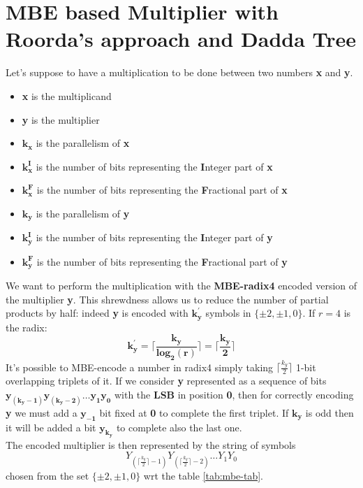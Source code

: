 \documentclass[a4paper]{article}
\begin{document}
\section{MBE based Multiplier with Roorda's approach and Dadda Tree}
	Let's suppose to have a multiplication to be done between two numbers \textbf{x} and \textbf{y}.
	\begin{itemize}
		\item \textbf{x} is the multiplicand
		\item \textbf{y} is the multiplier
		\item $\bm{k_x}$ is the parallelism of \textbf{x}
		\item $\bm{k_x^{I}}$ is the number of bits representing the \textbf{I}nteger part of \textbf{x}
		\item $\bm{k_x^{F}}$ is the number of bits representing the \textbf{F}ractional part of \textbf{x}
		\item $\bm{k_y}$ is the parallelism of \textbf{y}
		\item $\bm{k_y^{I}}$ is the number of bits representing the \textbf{I}nteger part of \textbf{y}
		\item $\bm{k_y^{F}}$ is the number of bits representing the \textbf{F}ractional part of \textbf{y}
	\end{itemize}
	We want to perform the multiplication with the \textbf{MBE-radix4} encoded version of the multiplier \textbf{y}.
	This shrewdness allows us to reduce the number of partial products by half:
	indeed \textbf{y} is encoded with $\bm{k_y^{'}}$ symbols in $\{\pm{2}, \pm{1}, 0\}$. If $r=4$ is the radix:
	\begin{equation}
		\bm{k_y^{'} = \lceil \frac{k_y}{log_2(r)} \rceil = \lceil \frac{k_y}{2} \rceil}
	\end{equation}
	It's possible to MBE-encode a number in radix4 simply taking $\lceil \frac{k_y}{2} \rceil$ 1-bit overlapping triplets of it.
	If we consider \textbf{y} represented as a sequence of bits $\bm{y_{(k_y-1)} y_{(k_y-2)} \ldots
	y_{1} y_{0}}$ with the \textbf{LSB} in position \textbf{0}, then for correctly encoding \textbf{y} we must add
	a $\bm{y_{-1}}$ bit fixed at \textbf{0} to complete the first triplet. If $\bm{k_y}$ is odd then it will be
	added a bit $\bm{y_{k_y}}$ to complete also the last one.\\
	The encoded multiplier is then represented by the string of symbols
	\begin{equation}
		Y_{(\lceil \frac{k_y}{2} \rceil - 1)} Y_{(\lceil \frac{k_y}{2} \rceil - 2)} \ldots Y_{1} Y_{0}
	\end{equation}
	chosen from the set $\{\pm{2}, \pm{1}, 0\}$ wrt the table \ref{tab:mbe-tab}.
\end{document}
